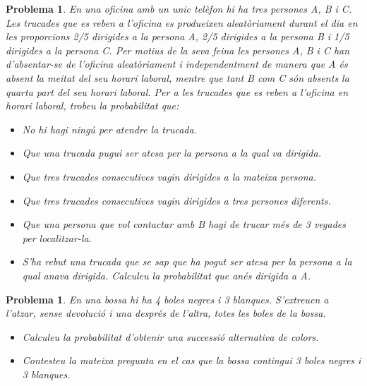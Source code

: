 \documentclass[11pt]{article}
\newcounter{prbcont}
\newtheorem{problema}[prbcont]{Problema}
\begin{document}
\begin{problema}
En una oficina amb un unic tel\`efon hi ha tres persones A, B i C. Les trucades que es reben a l'oficina es produeixen aleat\`oriament durant el dia en les proporcions 2/5 dirigides a la persona A, 2/5 dirigides a la persona B i 1/5 dirigides a la persona C. Per motius de la seva feina les persones A, B i C han d'absentar-se de l'oficina
aleat\`oriament i independentment de manera que A \'es absent la meitat del seu horari laboral, mentre que tant B com C s\'on absents la quarta part del seu horari laboral. Per a les trucades que es reben a l'oficina en horari laboral, trobeu la probabilitat que:
\begin{itemize}
\item [(a)] No hi hagi ning\'u per atendre la trucada. %
\item [(b)] Que una trucada pugui ser atesa per la persona a la qual va dirigida. %
\item [(c)] Que tres trucades consecutives vagin dirigides a la mateixa persona. %
\item [(d)] Que tres trucades consecutives vagin dirigides a tres persones diferents. %
\item [(e)] Que una persona que vol contactar amb B hagi de trucar m\'es de 3 vegades per localitzar-la. %
\item [(f)] S'ha rebut una trucada que se sap que ha pogut ser atesa per la persona a la qual anava dirigida. Calculeu la probabilitat que an\'es dirigida a A. %
\end{itemize}
\end{problema}
              

\begin{problema}
En una bossa hi ha 4 boles negres i 3 blanques. S'extreuen a l'atzar, sense devoluci\'o i una despr\'es de l'altra, totes les boles de la bossa. 
\begin{itemize}
\item [(a)] Calculeu la probabilitat d'obtenir una successi\'o alternativa de colors. %
\item [(b)] Contesteu la mateixa pregunta en el cas que la bossa contingui 3 boles negres i 3 blanques. %
\end{itemize}
\end{problema}
\end{document}
